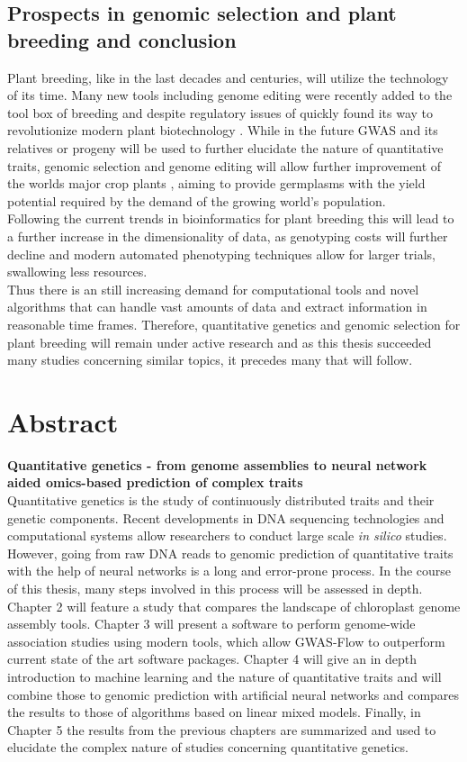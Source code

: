 \section{Prospects in genomic selection and plant breeding and conclusion}
Plant breeding, like in the last decades and centuries, will utilize the technology of its
time. Many new tools including genome editing were recently added to the tool box of
breeding and despite regulatory issues of quickly found its way to revolutionize modern
plant biotechnology \cite{araki2015towards}. While in the future GWAS and its relatives or
progeny will be used to further elucidate the nature of quantitative traits, genomic
selection and genome editing will allow further improvement of the worlds major crop
plants \cite{rodriguez2017engineering}, aiming to provide germplasms with the yield
potential required by the demand of the growing world's population.\\
Following the current trends in bioinformatics for plant breeding this will lead to a
further increase in the dimensionality of data, as genotyping costs will further decline
and modern automated phenotyping techniques allow for larger trials, swallowing less
resources. \\
Thus there is an still increasing demand for computational tools and novel algorithms that
can handle vast amounts of data and extract information in reasonable time
frames. Therefore, quantitative genetics and genomic selection for plant breeding will
remain under active research and as this thesis succeeded many studies concerning similar
topics, it precedes many that will follow.


\chapter{Abstract} %
\textbf{Quantitative genetics - from genome assemblies to neural network aided omics-based prediction of complex traits}\\
Quantitative genetics is the study of continuously distributed traits and their genetic
components. Recent developments in DNA sequencing technologies and computational systems
allow researchers to conduct large scale \textit{in silico} studies. However, going from
raw DNA reads to genomic prediction of quantitative traits with the help of neural
networks is a long and error-prone process. In the course of this thesis, many steps
involved in this process will be assessed in depth. Chapter 2 will feature a study that
compares the landscape of chloroplast genome assembly tools. Chapter 3 will present a
software to perform genome-wide association studies using modern tools, which allow
GWAS-Flow to outperform current state of the art software packages. Chapter 4 will give an
in depth introduction to machine learning and the nature of quantitative traits and will
combine those to genomic prediction with artificial neural networks and compares the
results to those of algorithms based on linear mixed models. Finally, in Chapter 5 the
results from the previous chapters are summarized and used to elucidate the complex nature
of studies concerning quantitative genetics.

